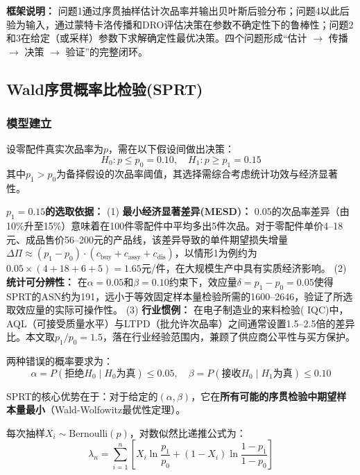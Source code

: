 \documentclass[12pt,a4paper]{ctexart}
\begin{document}
\textbf{框架说明：} 问题1通过序贯抽样估计次品率并输出贝叶斯后验分布；问题4以此后验为输入，通过蒙特卡洛传播和DRO评估决策在参数不确定性下的鲁棒性；问题2和3在给定（或采样）参数下求解确定性最优决策。四个问题形成``估计 $\to$ 传播 $\to$ 决策 $\to$ 验证''的完整闭环。

\subsection{Wald序贯概率比检验(SPRT)}

\subsubsection{模型建立}

设零配件真实次品率为$p$，需在以下假设间做出决策：
\begin{equation}
    H_0: p \leq p_0 = 0.10, \quad H_1: p \geq p_1 = 0.15
\end{equation}
其中$p_1>p_0$为备择假设的次品率阈值，其选择需综合考虑统计功效与经济显著性。

\textbf{$p_1=0.15$的选取依据：}
(1) \textbf{最小经济显著差异(MESD)：} 0.05的次品率差异（由10\%升至15\%）意味着在100件零配件中平均多出5件次品。对于零配件单价4--18元、成品售价56--200元的产品线，该差异导致的单件期望损失增量$\Delta\Pi \approx (p_1-p_0) \cdot (c_{\text{buy}} + c_{\text{assy}} + c_{\text{dis}})$，以情形1为例约为$0.05 \times (4+18+6+5) = 1.65$元/件，在大规模生产中具有实质经济影响。
(2) \textbf{统计可分辨性：} 在$\alpha=0.05$和$\beta=0.10$约束下，效应量$\delta = p_1-p_0 = 0.05$使得SPRT的ASN约为191，远小于等效固定样本量检验所需的1600--2646，验证了所选取效应量的实际可操作性。
(3) \textbf{行业惯例：} 在电子制造业的来料检验( IQC)中，AQL（可接受质量水平）与LTPD（批允许次品率）之间通常设置1.5--2.5倍的差异比。本文取$p_1/p_0 = 1.5$，落在行业经验范围内，兼顾了供应商公平性与买方保护。

两种错误的概率要求为：
\begin{equation}
    \alpha = P(\text{拒绝}H_0 \mid H_0\text{为真}) \leq 0.05, \quad
    \beta  = P(\text{接收}H_0 \mid H_1\text{为真}) \leq 0.10
\end{equation}

SPRT的核心优势在于：对于给定的$(\alpha,\beta)$，它在\textbf{所有可能的序贯检验中期望样本量最小}（Wald-Wolfowitz最优性定理）。

每次抽样$X_i \sim \text{Bernoulli}(p)$，对数似然比递推公式为：
\begin{equation}
    \lambda_n = \sum_{i=1}^{n} \left[ X_i \ln\frac{p_1}{p_0} + (1-X_i) \ln\frac{1-p_1}{1-p_0} \right]
\end{equation}
\end{document}
